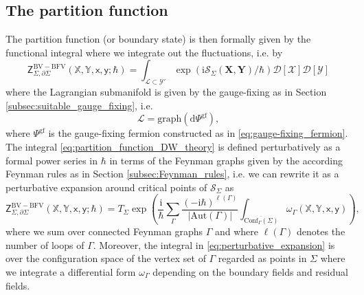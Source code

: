 \documentclass[11pt,colorinlistoftodos]{amsart}
\numberwithin{equation}{subsection}
\theoremstyle{plain}
\theoremstyle{definition}
\theoremstyle{remark}
\newcommand{\calY}{\mathcal{Y}}
\newcommand{\dd}{{\mathrm{d}}}
\newcommand{\de}{\partial}
\newcommand{\calS}{\mathcal{S}}
\newcommand{\calL}{\mathcal{L}}
\newcommand{\I}{\mathrm{i}}
\begin{document}
\subsection{The partition function}
The partition function (or boundary state) is then formally given by the functional integral where we integrate out the fluctuations, i.e. by
\begin{equation}
\label{eq:partition_function_DW_theory}
\mathsf{Z}^{\scriptscriptstyle\mathrm{BV-BFV}}_{\Sigma,\de\Sigma}(\mathds{X},\mathds{Y},\mathsf{x},\mathsf{y};\hbar)=\int_{\calL\subset\calY'} \exp\left(\I\calS_\Sigma(\mathbf{X},\mathbf{Y})/\hbar\right)\mathscr{D}[\mathscr{X}]\mathscr{D}[\mathscr{Y}]
\end{equation}
where the Lagrangian submanifold is given by the gauge-fixing as in Section \ref{subsec:suitable_gauge_fixing}, i.e.
\[
\calL=\mathrm{graph}(\dd\varPsi^\mathrm{gf}),
\]
where $\varPsi^\mathrm{gf}$ is the gauge-fixing fermion constructed as in \eqref{eq:gauge-fixing_fermion}. The integral \eqref{eq:partition_function_DW_theory} is defined perturbatively as a formal power series in $\hbar$ in terms of the Feynman graphs given by the according Feynman rules as in Section \ref{subsec:Feynman_rules}, i.e. we can rewrite it as a perturbative expansion around critical points of $\calS_\Sigma$ as
\begin{equation}
\label{eq:perturbative_expansion}
\mathsf{Z}^{\scriptscriptstyle\mathrm{BV-BFV}}_{\Sigma,\de\Sigma}(\mathds{X},\mathds{Y},\mathsf{x},\mathsf{y};\hbar)=T_\Sigma\exp\left(\frac{\I}{\hbar}\sum_\Gamma \frac{(-\I\hbar)^{\ell(\Gamma)}}{\vert\mathrm{Aut}(\Gamma)\vert}\int_{\overline{\mathrm{Conf}_\Gamma(\Sigma)}}\omega_\Gamma(\mathds{X},\mathds{Y},\mathsf{x},\mathsf{y})\right),
\end{equation}
where we sum over connected Feynman graphs $\Gamma$ and where $\ell(\Gamma)$ denotes the number of loops of $\Gamma$. Moreover, the integral in \eqref{eq:perturbative_expansion} is over the configuration space of the vertex set of $\Gamma$ regarded as points in $\Sigma$ where we integrate a differential form $\omega_\Gamma$ depending on the boundary fields and residual fields.
\end{document}
